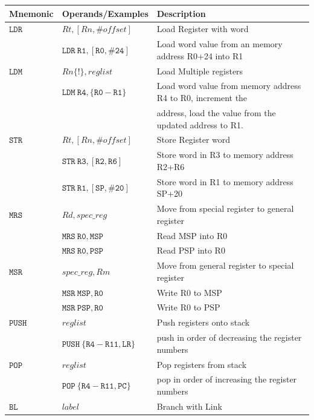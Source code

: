 \begin{table}
\begin{center}
\footnotesize
\begin{tabular}{lll}
\hline
Mnemonic & Operands/Examples & Description \\ \hline
$\mathtt{LDR}$ & $\mathit{Rt, [Rn, \#offset]}$ & Load Register with word \\
               & $\mathtt{LDR~ R1, [R0, \#24]}$ 
               & Load word value from an memory address R0+24 into R1\\ \hline
$\mathtt{LDM}$ & $\mathit{Rn \{!\}, reglist}$ & Load Multiple registers \\
        & $\mathtt{LDM~ R4, \{R0-R1\}}$   
        &  Load word value from memory address R4 to R0, increment the\\ 
       &&  address, load the value from the updated address to R1. \\ \hline
$\mathtt{STR}$ & $\mathit{Rt, [Rn, \#offset]}$ & Store Register word \\ 
        & $\mathtt{STR~ R3, [R2, R6]}$  
        & Store word in R3 to memory address R2+R6\\
        & $\mathtt{STR~ R1, [SP, \#20]}$
        & Store word in R1 to memory address SP+20 \\ \hline
$\mathtt{MRS}$ & $\mathit{Rd, spec\_reg}$ & Move from special register to general register \\
        & $\mathtt{MRS~ R0, MSP}$ & Read MSP into R0 \\ 
        & $\mathtt{MRS~ R0, PSP}$ & Read PSP into R0 \\ \hline
$\mathtt{MSR}$ & $\mathit{spec\_reg, Rm}$&  Move from general register to special register\\
        & $\mathtt{MSR~ MSP, R0}$ & Write R0 to MSP\\ 
        & $\mathtt{MSR~ PSP, R0}$ & Write R0 to PSP\\ \hline 
$\mathtt{PUSH}$ & $\mathit{reglist}$ & Push registers onto stack\\
        & $\mathtt{PUSH~\{R4-R11, LR\}}$ & push in order of decreasing the register numbers \\ \hline 
$\mathtt{POP}$ & $\mathit{reglist}$ & Pop registers from stack\\ 
        & $\mathtt{POP~\{R4-R11, PC\}}$ & pop in order of increasing the register numbers \\ \hline 
$\mathtt{BL}$ & $\mathit{label}$ & Branch with Link \\  

\end{tabular}
\end{center}
\end{table}
